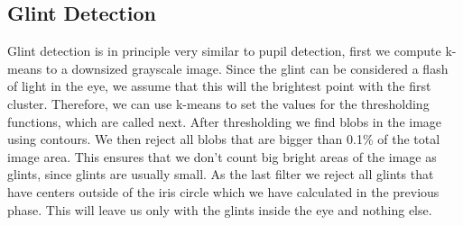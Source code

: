 \subsection{Glint Detection}

Glint detection is in principle very similar to pupil detection, first we compute k-means to a downsized grayscale image. Since the glint can be considered a flash of light in the eye, we assume that this will the brightest point with the first cluster. 
Therefore, we can use k-means to set the values for the thresholding functions, which are called next. After thresholding we find blobs in the image using contours. We then reject all blobs that are bigger than 0.1\% of the total image area. This ensures that we don't count big bright areas of the image as glints, since glints are usually small. As the last filter we reject all glints that have centers outside of the iris circle which we have calculated in the previous phase. This will leave us only with the glints inside the eye and nothing else.

